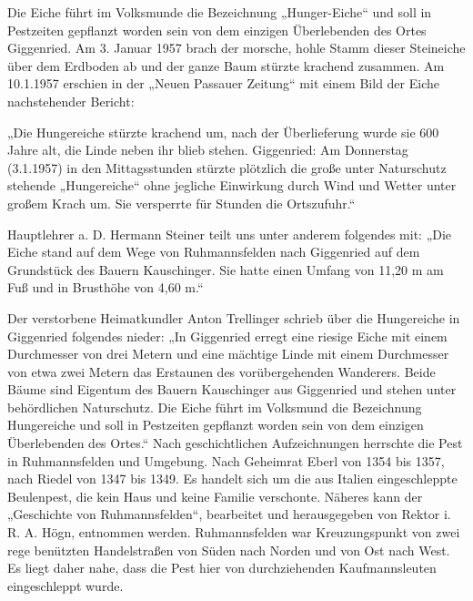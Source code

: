 \documentclass{book}
\begin{document}
Die Eiche führt im Volksmunde die Bezeichnung „Hunger-Eiche“ und soll in
Pestzeiten gepflanzt worden sein von dem einzigen Überlebenden des Ortes
Giggenried. Am 3. Januar 1957 brach der morsche, hohle Stamm dieser
Steineiche über dem Erdboden ab und der ganze Baum stürzte krachend
zusammen. Am 10.1.1957 erschien in der „Neuen Passauer Zeitung“ mit
einem Bild der Eiche nachstehender Bericht:

„Die Hungereiche stürzte krachend um, nach der Überlieferung wurde sie
600 Jahre alt, die Linde neben ihr blieb stehen. Giggenried: Am
Donnerstag (3.1.1957) in den Mittagsstunden stürzte plötzlich die große
unter Naturschutz stehende „Hungereiche“ ohne jegliche Einwirkung durch
Wind und Wetter unter großem Krach um. Sie versperrte für Stunden die
Ortszufuhr.“

Hauptlehrer a. D. Hermann Steiner teilt uns unter anderem folgendes mit:
„Die Eiche stand auf dem Wege von Ruhmannsfelden nach Giggenried auf dem
Grundstück des Bauern Kauschinger. Sie hatte einen Umfang von 11,20 m am
Fuß und in Brusthöhe von 4,60 m.“

Der verstorbene Heimatkundler Anton Trellinger schrieb über die
Hungereiche in Giggenried folgendes nieder: „In Giggenried erregt eine
riesige Eiche mit einem Durchmesser von drei Metern und eine mächtige
Linde mit einem Durchmesser von etwa zwei Metern das Erstaunen des
vorübergehenden Wanderers. Beide Bäume sind Eigentum des Bauern
Kauschinger aus Giggenried und stehen unter behördlichen Naturschutz.
Die Eiche führt im Volksmund die Bezeichnung Hungereiche und soll in
Pestzeiten gepflanzt worden sein von dem einzigen Überlebenden des
Ortes.“ Nach geschichtlichen Aufzeichnungen herrschte die Pest in
Ruhmannsfelden und Umgebung. Nach Geheimrat Eberl von 1354 bis 1357,
nach Riedel von 1347 bis 1349. Es handelt sich um die aus Italien
eingeschleppte Beulenpest, die kein Haus und keine Familie verschonte.
Näheres kann der „Geschichte von Ruhmannsfelden“, bearbeitet und
herausgegeben von Rektor i. R. A. Högn, entnommen werden. Ruhmannsfelden
war Kreuzungspunkt von zwei rege benützten Handelstraßen von Süden nach
Norden und von Ost nach West. Es liegt daher nahe, dass die Pest hier
von durchziehenden Kaufmannsleuten eingeschleppt wurde.
\end{document}
